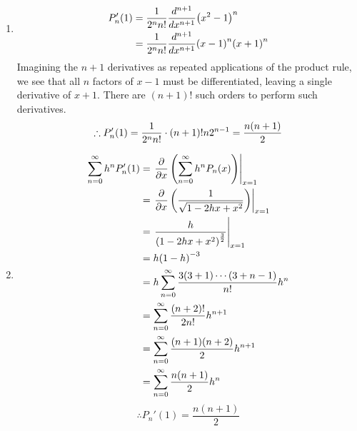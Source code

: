 \item

\begin{enumerate}[wide, labelindent = 0pt, label = (\alph*)]
\item 
\begin{align*}
    P_n'(1)
    &= \frac{1}{2^n n!} \frac{d^{n + 1}}{dx^{n + 1}} {\left( x^2 - 1 \right)}^n \\
    &= \frac{1}{2^n n!} \frac{d^{n + 1}}{dx^{n + 1}}
        {(x - 1)}^n {(x + 1)}^n
\end{align*}
Imagining the $n + 1$ derivatives as repeated applications of the product rule,
we see that all $n$ factors of $x - 1$ must be differentiated,
leaving a single derivative of $x + 1$.
There are $(n + 1)!$ such orders to perform such derivatives.
\[
    \therefore P_n'(1)
    = \frac{1}{2^n n!} \cdot (n + 1)! n 2^{n - 1}
    = \frac{n(n + 1)}{2}
\]

\item
\begin{align*}
    \sum_{n = 0}^\infty h^n P_n'(1)
    &= {\left. 
        \frac{\partial}{\partial{}x} \left(\sum_{n = 0}^\infty h^n P_n(x) \right)
     \right|}_{x = 1} \\
    &= {\left. 
        \frac{\partial}{\partial{}x} \left( \frac{1}{\sqrt{1 - 2hx + x^2}} \right)
     \right|}_{x = 1} \\
    &= {\left. 
        \frac{h}{{\left( 1 - 2hx + x^2 \right) }^{\frac{3}{2}}}
     \right|}_{x = 1} \\
    &= h {(1 - h)}^{-3} \\
    &= h \sum_{n = 0}^\infty \frac{3 (3 + 1) \cdots (3 + n - 1)}{n!} h^n \\
    &= \sum_{n = 0}^\infty \frac{(n + 2)!}{2n!} h^{n + 1} \\
    &= \sum_{n = 0}^\infty \frac{(n + 1) (n + 2)}{2} h^{n + 1} \\
    &= \sum_{n = 0}^\infty \frac{n (n + 1)}{2} h^n
\end{align*}
\[
    \therefore P_n'(1)
    = \frac{n (n + 1)}{2}
\]
\end{enumerate}